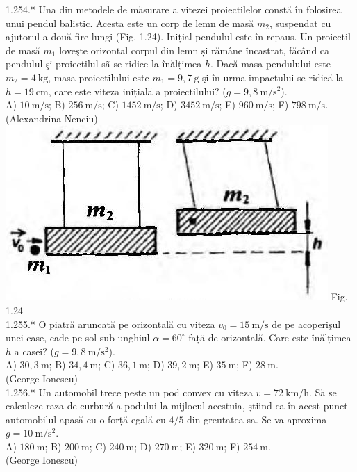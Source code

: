 1.254.* Una din metodele de măsurare a vitezei proiectilelor constă în folosirea unui pendul balistic. Acesta este un corp de lemn de masă $m_{2}$, suspendat cu ajutorul a două fire lungi (Fig. 1.24). Inițial pendulul este în repaus. Un proiectil de masă $m_{1}$ loveşte orizontal corpul din lemn și rămâne încastrat, făcând ca pendulul şi proiectilul sã se ridice la înălțimea $h$. Dacă masa pendulului este $m_{2}=4 \mathrm{~kg}$, masa proiectilului este $m_{1}=9,7 \mathrm{~g}$ şi în urma impactului se ridică la $h=19 \mathrm{~cm}$, care este viteza inițială a proiectilului? ($g=9,8 \mathrm{~m} / \mathrm{s}^{2}$).\\ A) $10 \mathrm{~m} / \mathrm{s}$; B) $256 \mathrm{~m} / \mathrm{s}$; C) $1452 \mathrm{~m} / \mathrm{s}$; D) $3452 \mathrm{~m} / \mathrm{s}$; E) $960 \mathrm{~m} / \mathrm{s}$; F) $798 \mathrm{~m} / \mathrm{s}$.\\ (Alexandrina Nenciu)\\ \includegraphics[width=0.4\linewidth]{images/2025_07_01_5b3ff9fa0d508c8e9f17g-058} Fig. 1.24\\

1.255.* O piatră aruncată pe orizontală cu viteza $v_{0}=15 \mathrm{~m} / \mathrm{s}$ de pe acoperişul unei case, cade pe sol sub unghiul $\alpha=60^{\circ}$ față de orizontală. Care este înălțimea $h$ a casei? ($g=9,8 \mathrm{~m} / \mathrm{s}^{2}$).\\ A) $30,3 \mathrm{~m}$; B) $34,4 \mathrm{~m}$; C) $36,1 \mathrm{~m}$; D) $39,2 \mathrm{~m}$; E) $35 \mathrm{~m}$; F) $28 \mathrm{~m}$.\\ (George Ionescu)\\

1.256.* Un automobil trece peste un pod convex cu viteza $v=72 \mathrm{~km} / \mathrm{h}$. Să se calculeze raza de curbură a podului la mijlocul acestuia, știind ca în acest punct automobilul apasă cu o forță egală cu $4 / 5$ din greutatea sa. Se va aproxima $g=10 \mathrm{~m} / \mathrm{s}^{2}$.\\ A) $180 \mathrm{~m}$; B) $200 \mathrm{~m}$; C) $240 \mathrm{~m}$; D) $270 \mathrm{~m}$; E) $320 \mathrm{~m}$; F) $254 \mathrm{~m}$.\\ (George Ionescu)\\


